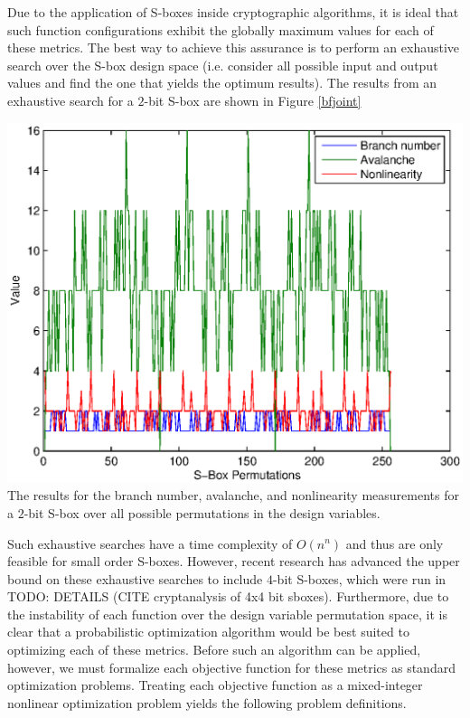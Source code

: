 \documentclass[11pt]{article}
\begin{document}
Due to the application of S-boxes inside cryptographic algorithms, it is ideal that such function configurations exhibit the globally maximum values for each of these metrics. The best way to achieve this assurance is to perform an exhaustive search over the S-box design space (i.e. consider all possible input and output values and find the one that yields the optimum results). The results from an exhaustive search for a $2$-bit S-box are shown in Figure \ref{bfjoint}

\begin{center}
	\includegraphics[scale=0.75]{images/brute_joint.eps} \\
	\label{bfjoint}
The results for the branch number, avalanche, and nonlinearity measurements for a $2$-bit S-box over all possible permutations in the design variables. 
\end{center}

Such exhaustive searches have a time complexity of $O(n^n)$ and thus are only feasible for small order S-boxes. However, recent research has advanced the upper bound on these exhaustive searches to include $4$-bit S-boxes, which were run in TODO: DETAILS (CITE cryptanalysis of 4x4 bit sboxes). Furthermore, due to the instability of each function over the design variable permutation space, it is clear that a probabilistic optimization algorithm would be best suited to optimizing each of these metrics. Before such an algorithm can be applied, however, we must formalize each objective function for these metrics as standard optimization problems. Treating each objective function as a mixed-integer nonlinear optimization problem yields the following problem definitions. \\
\end{document}
